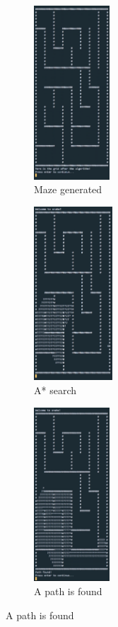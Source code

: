 \documentclass[11pt]{article}
\begin{document}
\begin{figure}[H]
\centering
\begin{subfigure}{0.24\textwidth}
    \includegraphics[height=6.5cm]{Maze_Generated} 
    \caption{Maze generated}
    \label{fig:subim1}
\end{subfigure}
\begin{subfigure}{0.24\textwidth}
    \includegraphics[height=6.5cm]{A_Star_Search_Maze}
    \caption{A* search}
    \label{fig:subim2}
\end{subfigure}
\begin{subfigure}{0.24\textwidth}
    \includegraphics[height=6.5cm]{A_Star_Path_Found_Maze}
    \caption{A path is found}
    \label{fig:subim3}

\end{subfigure}
\end{figure}
\end{document}

